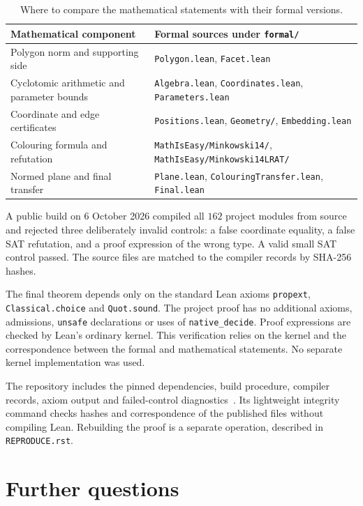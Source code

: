 \documentclass[11pt,a4paper]{article}
\theoremstyle{remark}
\newcommand{\code}[1]{\texttt{#1}}
\begin{document}
\begin{table}[ht]
\centering\small
\begin{tabular}{>{\raggedright\arraybackslash}p{.40\linewidth}>{\raggedright\arraybackslash}p{.51\linewidth}}
\toprule
Mathematical component & Formal sources under \code{formal/}\\
\midrule
Polygon norm and supporting side & \code{Polygon.lean}, \code{Facet.lean}\\
Cyclotomic arithmetic and parameter bounds & \code{Algebra.lean}, \code{Coordinates.lean}, \code{Parameters.lean}\\
Coordinate and edge certificates & \code{Positions.lean}, \code{Geometry/}, \code{Embedding.lean}\\
Colouring formula and refutation & \code{MathIsEasy/Minkowski14/}, \code{MathIsEasy/Minkowski14LRAT/}\\
Normed plane and final transfer & \code{Plane.lean}, \code{ColouringTransfer.lean}, \code{Final.lean}\\
\bottomrule
\end{tabular}
\caption{Where to compare the mathematical statements with their formal versions.}
\label{tab:formal}
\end{table}

A public build on 6 October 2026 compiled all $162$ project modules
from source and rejected three deliberately invalid controls: a false
coordinate equality, a false SAT refutation, and a proof expression of
the wrong type. A valid small SAT control passed. The source files are
matched to the compiler records by SHA-256 hashes.

The final theorem depends only on the standard Lean axioms
\code{propext}, \code{Classical.choice} and \code{Quot.sound}.
The project proof has no additional axioms, admissions, \code{unsafe}
declarations or uses of \code{native\_decide}. Proof expressions are
checked by Lean's ordinary kernel. This verification relies on the
kernel and the correspondence between the formal and mathematical
statements. No separate kernel implementation was used.

The repository includes the pinned dependencies, build procedure,
compiler records, axiom output and failed-control diagnostics~\cite{artifact}.
Its lightweight integrity command checks hashes and correspondence of
the published files without compiling Lean. Rebuilding the proof is
a separate operation, described in \code{REPRODUCE.rst}.

\section{Further questions}
\end{document}
